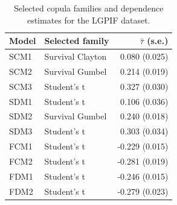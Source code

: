 \begin{table}[h!]
\centering
\begin{tabular}{llr}
\toprule
Model & Selected family & $\widehat{\tau}$ (s.e.) \\
\midrule
SCM1 & Survival Clayton & 0.080 (0.025) \\
SCM2 & Survival Gumbel & 0.214 (0.019) \\
SCM3 & Student's t & 0.327 (0.030) \\
SDM1 & Student's t & 0.106 (0.036) \\
SDM2 & Survival Gumbel & 0.240 (0.018) \\
SDM3 & Student's t & 0.303 (0.034) \\
FCM1 & Student's t & -0.229 (0.015) \\
FCM2 & Student's t & -0.281 (0.019) \\
FDM1 & Student's t & -0.246 (0.015) \\
FDM2 & Student's t & -0.279 (0.023) \\
\bottomrule
\end{tabular}
\caption{Selected copula families and dependence estimates for the LGPIF dataset.}
\label{tab:lgpif_dependence}
\end{table}


